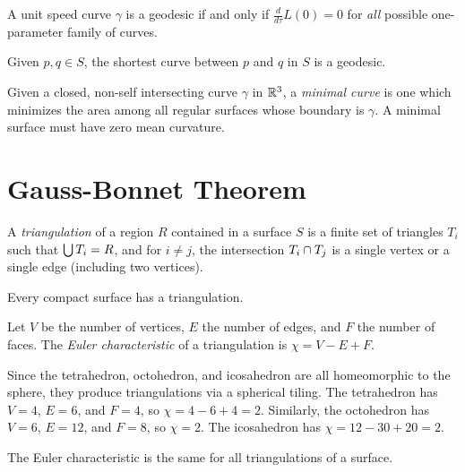 \begin{thm}
    A unit speed curve $\gamma$ is a geodesic if and only if $\frac{d}{d\tau}L(0) = 0$ for \emph{all} possible one-parameter family of curves.
\end{thm}

\begin{cor}
    Given $p, q \in S$, the shortest curve between $p$ and $q$ in $S$ is a geodesic.
\end{cor}

\begin{rmk}
    Given a closed, non-self intersecting curve $\gamma$ in $\mathbb{R}^3$, a \emph{minimal curve} is one which minimizes the area among all regular surfaces whose boundary is $\gamma$. A minimal surface must have zero mean curvature.
\end{rmk}

\section{Gauss-Bonnet Theorem}

\begin{defn}
    A \emph{triangulation} of a region $
    R$ contained in a surface $S$ is a finite set of triangles $T_i$ such that $\bigcup T_i = R$, and for $i \neq j$, the intersection $T_i \cap T_j$ is a single vertex or a single edge (including two vertices).
\end{defn}

\begin{thm}
    Every compact surface has a triangulation.
\end{thm}

\begin{defn}
    Let $V$ be the number of vertices, $E$ the number of edges, and $F$ the number of faces. The \emph{Euler characteristic} of a triangulation is $\chi = V - E + F$.
\end{defn}

\begin{exmp}
    Since the tetrahedron, octohedron, and icosahedron are all homeomorphic to the sphere, they produce triangulations via a spherical tiling. The tetrahedron has $V = 4$, $E = 6$, and $F = 4$, so $\chi = 4 - 6 + 4 = 2$. Similarly, the octohedron has $V = 6$, $E = 12$, and $F = 8$, so $\chi = 2$. The icosahedron has $\chi = 12 - 30 + 20 = 2$.
\end{exmp}

\begin{thm}
    The Euler characteristic is the same for all triangulations of a surface.
\end{thm}

